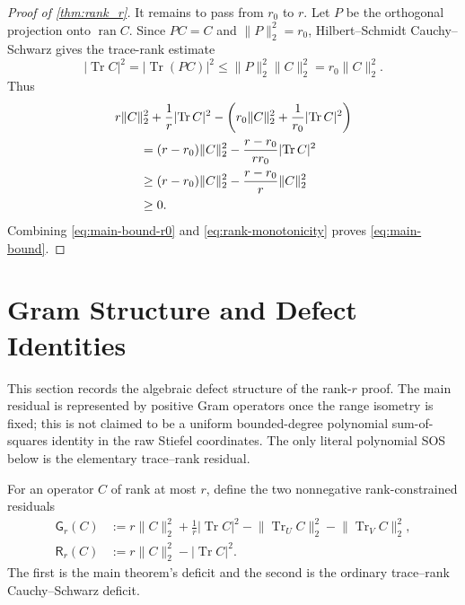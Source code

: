 \documentclass[11pt,reqno]{amsart}
\theoremstyle{remark}
\DeclareMathOperator{\Tr}{Tr}
\DeclareMathOperator{\ran}{ran}
\newcommand{\norm}[1]{\lVert #1\rVert}
\newcommand{\abs}[1]{\lvert #1\rvert}
\begin{document}
\begin{proof}[Proof of \cref{thm:rank_r}]
It remains to pass from $r_0$ to $r$. Let $P$ be the orthogonal
projection onto $\ran C$. Since $PC=C$ and $\norm{P}_2^2=r_0$,
Hilbert--Schmidt Cauchy--Schwarz gives the trace-rank estimate
\[
    \abs{\Tr C}^2
    =\abs{\Tr(PC)}^2
    \le
    \norm{P}_2^2\norm{C}_2^2
    =
    r_0\norm{C}_2^2.
\]
Thus
\begin{align}
    &
    r\norm{C}_2^2
    +
    \frac1r\abs{\Tr C}^2
    -
    \left(
      r_0\norm{C}_2^2
      +
      \frac1{r_0}\abs{\Tr C}^2
    \right)
    \notag\\
    &\qquad
    =
    (r-r_0)\norm{C}_2^2
    -
    \frac{r-r_0}{rr_0}\abs{\Tr C}^2
    \notag\\
    &\qquad
    \ge
    (r-r_0)\norm{C}_2^2
    -
    \frac{r-r_0}{r}\norm{C}_2^2
    \notag\\
    &\qquad
    \ge0.
\label{eq:rank-monotonicity}
\end{align}
Combining \cref{eq:main-bound-r0} and
\cref{eq:rank-monotonicity} proves \cref{eq:main-bound}.
\end{proof}

\section{Gram Structure and Defect Identities}

This section records the algebraic defect structure of the rank-$r$
proof. The main residual is represented by positive Gram operators
once the range isometry is fixed; this is not claimed to be a uniform
bounded-degree polynomial sum-of-squares identity in the raw Stiefel
coordinates. The only literal polynomial SOS below is the elementary
trace--rank residual.

For an operator $C$ of rank at most $r$, define the two nonnegative
rank-constrained residuals
\begin{align}
    \mathsf G_r(C)
    &:=%
    r\norm C_2^2+\frac1r\abs{\Tr C}^2
    -\norm{\Tr_U C}_2^2-\norm{\Tr_V C}_2^2,
\label{eq:sos-main-gap}\\
    \mathsf R_r(C)
    &:=%
    r\norm C_2^2-\abs{\Tr C}^2.
\label{eq:sos-trace-rank-gap}
\end{align}
The first is the main theorem's deficit and the second is the ordinary
trace--rank Cauchy--Schwarz deficit.
\end{document}
